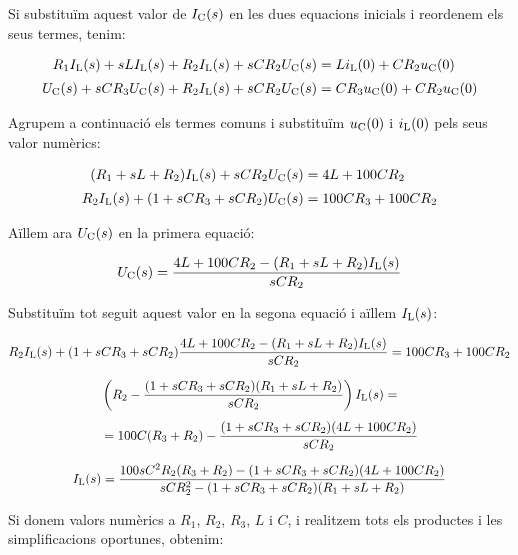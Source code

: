 \begin{exemple}
    Si substituïm aquest valor de $I_\mathrm{C}(s)$ en les dues equacions
    inicials i reordenem els seus termes, tenim:

    \begin{align*}
        R_1 I_\mathrm{L}(s) + s L I_\mathrm{L}(s)  + R_2
        I_\mathrm{L}(s) + s C R_2 U_\mathrm{C}(s) &= L i_\mathrm{L}(0) + C R_2 u_\mathrm{C}(0)\\[0.5ex]
        U_\mathrm{C}(s) + s C R_3 U_\mathrm{C}(s) + R_2 I_\mathrm{L}(s) + s C R_2 U_\mathrm{C}(s)
        &= C R_3 u_\mathrm{C}(0) + C R_2 u_\mathrm{C}(0)
    \end{align*}

    Agrupem a continuació els termes comuns i substituïm $u_\mathrm{C}(0)$ i
    $i_\mathrm{L}(0)$ pels seus valor numèrics:

    \begin{align*}
        (R_1 + s L + R_2) I_\mathrm{L}(s) + s C R_2 U_\mathrm{C}(s) &= 4 L  + 100 C R_2\\[0.5ex]
        R_2 I_\mathrm{L}(s) + (1 +s C R_3 + s C R_2) U_\mathrm{C}(s) &= 100 C R_3  + 100 C R_2
    \end{align*}

    Aïllem ara $U_\mathrm{C}(s)$ en la primera equació:

    \[
        U_\mathrm{C}(s) = \frac{4 L  + 100 C R_2 -(R_1 + s L + R_2) I_\mathrm{L}(s)}{s C R_2}
    \]

    Substituïm tot seguit aquest valor en la segona equació i aïllem
    $I_\mathrm{L}(s)$:

    \begin{gather*}
       R_2 I_\mathrm{L}(s) + (1 + s C R_3 + s C R_2) \frac{4 L  + 100 C R_2 - (R_1 + s L + R_2)I_\mathrm{L}(s)}{s C R_2} = 100 C R_3  + 100 C R_2 \\[1.5ex]
       \begin{split} &\left( R_2 - \frac{(1 +s C R_3 + s C R_2)(R_1 + s L + R_2)}{s C R_2} \right) I_\mathrm{L}(s)
       = \\[1ex] &= 100 C (R_3  + R_2) - \frac{(1 +s C R_3 + s C R_2)(4 L  + 100 C R_2)}{s C
       R_2}\end{split}\\[1.5ex]
    I_\mathrm{L}(s) = \frac{100 s C^2 R_2(R_3  + R_2)- (1 +s C R_3 + s C
    R_2)(4 L  + 100 C R_2)}{s C R_2^2  -(1 +s C R_3 + s C R_2)(R_1 + s L
    + R_2)}
    \end{gather*}

    Si donem valors numèrics a $R_1$, $R_2$, $R_3$, $L$ i $C$, i
    realitzem tots els productes i les  simplificacions oportunes,
    obtenim:


\end{exemple}

